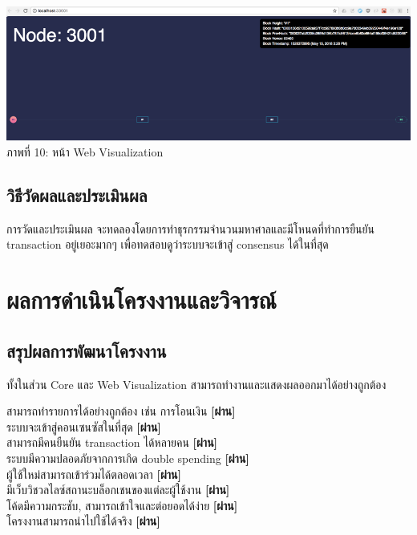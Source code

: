 \documentclass[letterpaper, 10pt, conference]{ieeeconf}
\begin{document}
\begin{enumerate}
		{\centering
			\includegraphics[scale=0.51]{result-3} \\
			ภาพที่ 10: หน้า Web Visualization \par
		}
	\end{enumerate}

\subsection{วิธีวัดผลและประเมินผล}
	\par การวัดและประเมินผล จะทดลองโดยการทำธุรกรรมจำนวนมหาศาลและมีโหนดที่ทำการยืนยัน transaction อยู่เยอะมากๆ เพื่อทดสอบดูว่าระบบจะเข้าสู่ consensus ได้ในที่สุด

\section{ผลการดำเนินโครงงานและวิจารณ์}

\subsection{สรุปผลการพัฒนาโครงงาน}
	ทั้งในส่วน Core และ Web Visualization สามารถทำงานและแสดงผลออกมาได้อย่างถูกต้อง
	\medskip

	\noindent
	สามารถทำรายการได้อย่างถูกต้อง เช่น การโอนเงิน 
	\hfill
	\textbf{[ผ่าน]} \\
	ระบบจะเข้าสู่คอนเซนซัสในที่สุด
	\hfill
	\textbf{[ผ่าน]} \\
	สามารถมีคนยืนยัน transaction ได้หลายคน
	\hfill
	\textbf{[ผ่าน]} \\
	ระบบมีความปลอดภัยจากการเกิด double spending
	\hfill
	\textbf{[ผ่าน]} \\
	ผู้ใช้ใหม่สามารถเข้าร่วมได้ตลอดเวลา
	\hfill
	\textbf{[ผ่าน]} \\
	มีเว็บวิชวลไลซ์สถานะบล็อกเชนของแต่ละผู้ใช้งาน
	\hfill
	\textbf{[ผ่าน]} \\
	โค้ดมีความกระชับ, สามารถเข้าใจและต่อยอดได้ง่าย 
	\hfill
	\textbf{[ผ่าน]} \\
	โครงงานสามารถนำไปใช้ได้จริง 
	\hfill
	\textbf{[ผ่าน]} \\
\end{document}
